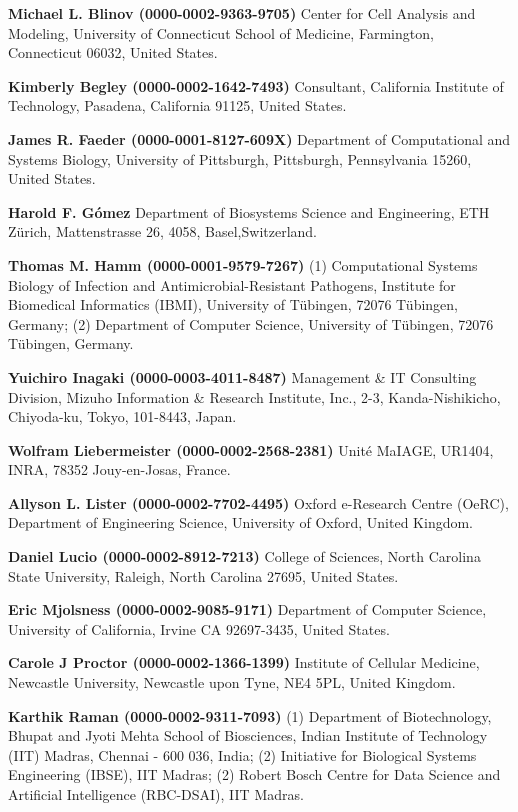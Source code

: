 \documentclass{sbml-paper}
\begin{document}
\textbf{Michael L. Blinov (0000-0002-9363-9705)} Center for Cell Analysis and Modeling, University of Connecticut School of Medicine, Farmington, Connecticut 06032, United States.

\textbf{Kimberly Begley (0000-0002-1642-7493)} Consultant, California Institute of Technology, Pasadena, California 91125, United States.

\textbf{James R. Faeder (0000-0001-8127-609X)} Department of Computational and Systems Biology, University of Pittsburgh, Pittsburgh, Pennsylvania 15260, United States.

\textbf{Harold F. Gómez} Department of Biosystems Science and Engineering, ETH Zürich, Mattenstrasse 26, 4058, Basel,Switzerland.

\textbf{Thomas M. Hamm (0000-0001-9579-7267)} (1) Computational Systems Biology of Infection and Antimicrobial-Resistant Pathogens, Institute for Biomedical Informatics (IBMI), University of Tübingen, 72076 Tübingen, Germany; (2) Department of Computer Science, University of Tübingen, 72076 Tübingen, Germany.

\textbf{Yuichiro Inagaki (0000-0003-4011-8487)} Management \& IT Consulting Division, Mizuho Information \& Research Institute, Inc., 2-3, Kanda-Nishikicho, Chiyoda-ku, Tokyo, 101-8443, Japan.

\textbf{Wolfram Liebermeister (0000-0002-2568-2381)} Unité MaIAGE, UR1404, INRA, 78352 Jouy-en-Josas, France.

\textbf{Allyson L. Lister (0000-0002-7702-4495)} Oxford e-Research Centre (OeRC), Department of Engineering Science, University of Oxford, United Kingdom.

\textbf{Daniel Lucio (0000-0002-8912-7213)} College of Sciences, North Carolina State University, Raleigh, North Carolina 27695, United States.

\textbf{Eric Mjolsness (0000-0002-9085-9171)} Department of Computer Science, University of California, Irvine CA 92697-3435, United States.

\textbf{Carole J Proctor (0000-0002-1366-1399)} Institute of Cellular Medicine, Newcastle University, Newcastle upon Tyne, NE4 5PL, United Kingdom.

\textbf{Karthik Raman (0000-0002-9311-7093)} (1) Department of Biotechnology, Bhupat and Jyoti Mehta School of Biosciences, Indian Institute of Technology (IIT) Madras, Chennai - 600 036, India; (2) Initiative for Biological Systems Engineering (IBSE), IIT Madras; (2) Robert Bosch Centre for Data Science and Artificial Intelligence (RBC-DSAI), IIT Madras.
\end{document}
